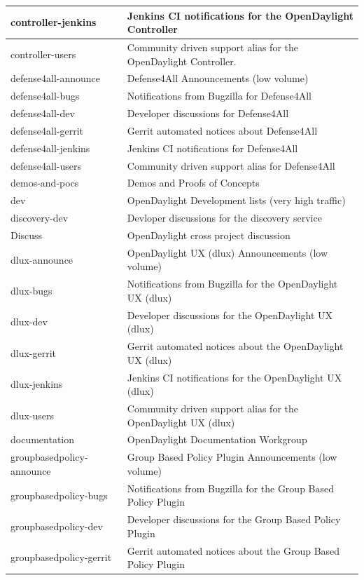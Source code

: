 \documentclass[a4paper, 12pt]{book}
\begin{document}
\begin{longtable}{|p{4cm}|p{10cm}|}
controller-jenkins &	Jenkins CI notifications for the OpenDaylight Controller \\ \hline
controller-users &	Community driven support alias for the OpenDaylight Controller. \\ \hline
defense4all-announce &	Defense4All Announcements (low volume) \\ \hline
defense4all-bugs &	Notifications from Bugzilla for Defense4All \\ \hline
defense4all-dev &	Developer discussions for Defense4All \\ \hline
defense4all-gerrit &	Gerrit automated notices about Defense4All \\ \hline
defense4all-jenkins &	Jenkins CI notifications for Defense4All \\ \hline
defense4all-users &	Community driven support alias for Defense4All \\ \hline
demos-and-pocs &	Demos and Proofs of Concepts \\ \hline
dev &	OpenDaylight Development lists (very high traffic) \\ \hline
discovery-dev &	Devloper discussions for the discovery service \\ \hline
Discuss &	OpenDaylight cross project discussion \\ \hline
dlux-announce &	OpenDaylight UX (dlux) Announcements (low volume) \\ \hline
dlux-bugs &	Notifications from Bugzilla for the OpenDaylight UX (dlux) \\ \hline
dlux-dev &	Developer discussions for the OpenDaylight UX (dlux) \\ \hline
dlux-gerrit &	Gerrit automated notices about the OpenDaylight UX (dlux) \\ \hline
dlux-jenkins &	Jenkins CI notifications for the OpenDaylight UX (dlux) \\ \hline
dlux-users &	Community driven support alias for the OpenDaylight UX (dlux) \\ \hline
documentation &	OpenDaylight Documentation Workgroup \\ \hline
groupbasedpolicy-announce &	Group Based Policy Plugin Announcements (low volume) \\ \hline
groupbasedpolicy-bugs &	Notifications from Bugzilla for the Group Based Policy Plugin \\ \hline
groupbasedpolicy-dev &	Developer discussions for the Group Based Policy Plugin \\ \hline
groupbasedpolicy-gerrit &	Gerrit automated notices about the Group Based Policy Plugin \\ \hline

\end{longtable}
\end{document}
